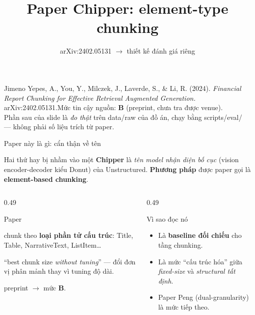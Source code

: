 \documentclass[aspectratio=169,11pt]{beamer}
\title[Paper Chipper \& cách đánh giá]{Paper Chipper: element-type chunking}
\subtitle[Đọc cơ chế và đo trên corpus tiếng Việt]{arXiv:2402.05131 $\rightarrow$ thiết kế đánh giá riêng}
\author{}
\date{}
\newcommand{\src}[1]{{\footnotesize\ttfamily #1}}
\begin{document}
\begin{frame}
  \titlepage
  \vspace{-1.4em}
  {\footnotesize
  Jimeno Yepes, A., You, Y., Milczek, J., Laverde, S., \& Li, R. (2024).\quad
  \emph{Financial Report Chunking for Effective Retrieval Augmented Generation.}\quad
  arXiv:2402.05131.\quad Mức tin cậy nguồn: \textbf{B} (preprint, chưa tra được venue).\\
  Phần sau của slide là \emph{đo thật} trên \src{data/raw} của đồ án, chạy bằng
  \src{scripts/eval/} — không phải số liệu trích từ paper.}
\end{frame}

\begin{frame}{Paper này là gì: cẩn thận về tên}
  \begin{alertblock}{\small Hai thứ hay bị nhầm vào một}
    \textbf{Chipper} là \emph{tên model nhận diện bố cục} (vision encoder-decoder
    kiểu Donut) của Unstructured.\quad
    \textbf{Phương pháp} được paper gọi là \textbf{element-based chunking}.
  \end{alertblock}
  \begin{columns}[T]
    \begin{column}{0.49\textwidth}
      \begin{block}{\small Paper}
        \begin{description}\small
          \item[Đơn vị] chunk theo \textbf{loại phần tử cấu trúc}: Title, Table,
            NarrativeText, ListItem\ldots
          \item[Điểm nhấn] ``best chunk size \emph{without tuning}'' — đổi đơn vị
            phân mảnh thay vì tuning độ dài.
          \item[Trạng thái] preprint $\rightarrow$ mức \textbf{B}.
        \end{description}
      \end{block}
    \end{column}
    \begin{column}{0.49\textwidth}
      \begin{block}{\small Vì sao đọc nó}
        \begin{itemize}\small
          \item Là \textbf{baseline đối chiếu} cho tầng chunking.
          \item Là mức ``cấu trúc hóa'' giữa \emph{fixed-size} và
            \emph{structural tất định}.
          \item Paper Peng (dual-granularity) là mức tiếp theo.
        \end{itemize}
      \end{block}
    \end{column}
  \end{columns}
\end{frame}
\end{document}
